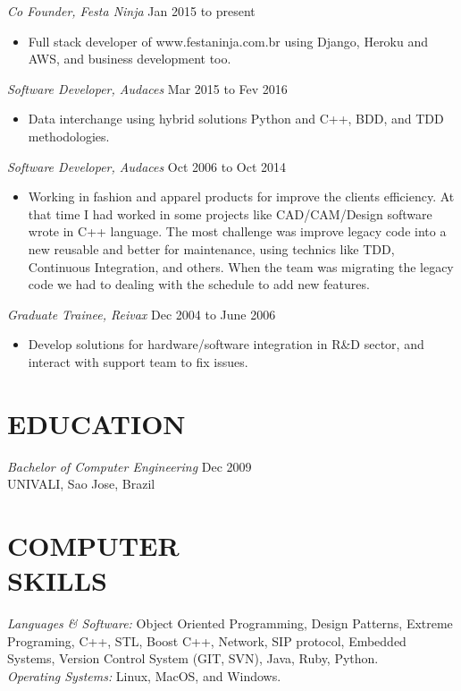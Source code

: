 \documentclass[line,margin]{res}
\begin{document}
\begin{resume}
                {\sl Co Founder, Festa Ninja} \hfill Jan 2015 to present \\
                 \begin{itemize}  \itemsep -2pt
                 \item Full stack developer of www.festaninja.com.br using Django, Heroku and AWS, and business development too.
                 \end{itemize} 
                {\sl Software Developer, Audaces} \hfill Mar 2015 to Fev 2016 \\
                  \begin{itemize}
                   \item Data interchange using hybrid solutions Python and C++, BDD, and TDD methodologies.
                   \end{itemize} 
   {\sl Software Developer, Audaces} \hfill Oct 2006 to Oct 2014 \\
                  \begin{itemize}
                   \item Working in fashion and apparel products for improve the clients efficiency. At that time I had worked in some projects like CAD/CAM/Design software wrote in C++ language. The most challenge was improve legacy code into a new reusable and better for maintenance, using technics like TDD, Continuous Integration, and others. When the team was migrating the legacy code we had to dealing with the schedule to add new features.
                   \end{itemize} 
                     {\sl Graduate Trainee, Reivax} \hfill Dec 2004 to June 2006 \\
                  \begin{itemize}
                   \item Develop solutions for hardware/software integration in R\&D sector, and interact with support team to fix issues.
                   \end{itemize} 
\section{EDUCATION} {\sl Bachelor of Computer Engineering} \hfill Dec 2009\\
                UNIVALI, Sao Jose, Brazil
 
 
\section{COMPUTER \\ SKILLS} {\sl Languages \& Software:} Object Oriented Programming, Design Patterns, Extreme Programing, C++, STL, Boost C++, Network, SIP protocol, Embedded Systems, Version Control System (GIT, SVN), Java, Ruby, Python. \\
                {\sl Operating Systems:} Linux, MacOS, and Windows.
 

\end{resume}
\end{document}
